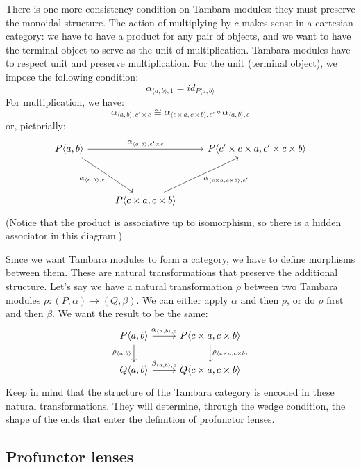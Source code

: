\documentclass[DaoFP]{subfiles}
\begin{document}
There is one more consistency condition on Tambara modules: they must preserve the monoidal structure. The action of multiplying by $c$ makes sense in a cartesian category: we have to have a product for any pair of objects, and we want to have the terminal object to serve as the unit of multiplication. Tambara modules have to respect unit and preserve multiplication. For the unit (terminal object), we impose the following condition:
\[ \alpha_{\langle a, b \rangle, 1} = id _{P \langle a, b \rangle}\]
For multiplication, we have:
\[ \alpha_{\langle a, b \rangle, c' \times c} \cong  \alpha_{\langle c \times a, c \times b \rangle, c'} \circ  \alpha_{\langle a, b \rangle, c}\]
or, pictorially:
\[
 \begin{tikzcd}
 P \langle a, b \rangle
 \arrow[rr, "{\alpha_{\langle a, b \rangle, c' \times c } }"]
 \arrow[rdd, "{ \alpha_{\langle a, b \rangle, c}}"']
 &&
 P \langle c' \times c \times a, c' \times c \times b \rangle
 \\
 \\
 & P \langle c \times a, c \times b \rangle
  \arrow[ruu, "{\alpha_{\langle c \times a, c \times b \rangle, c'}}"']
\end{tikzcd}
\]
(Notice that the product is associative up to isomorphism, so there is a hidden associator in this diagram.)

Since we want Tambara modules to form a category, we have to define morphisms between them. These are natural transformations that preserve the additional structure. Let's say we have a natural transformation $\rho$ between two Tambara modules $\rho \colon (P, \alpha) \to (Q, \beta) $. We can either apply $\alpha$ and then $\rho$, or do $\rho$ first and then  $\beta$. We want the result to be the same:
\[
 \begin{tikzcd}
  P \langle a, b \rangle
 \arrow[d, "{ \rho_{\langle a, b \rangle}}"']
 \arrow[r, "{ \alpha_{\langle a, b \rangle, c}}"]
  &  P \langle c \times a, c \times b \rangle
  \arrow[d, "{ \rho_{\langle c \times a, c \times b \rangle}}"]
\\
   Q \langle a, b \rangle
 \arrow[r, "{ \beta_{\langle a, b \rangle, c}}"]
 &  Q \langle c \times a, c \times b \rangle
 \end{tikzcd}
\]
Keep in mind that the structure of the Tambara category is encoded in these natural transformations. They will determine, through the wedge condition, the shape of the ends that enter the definition of profunctor lenses.

\subsection{Profunctor lenses}
\end{document}

